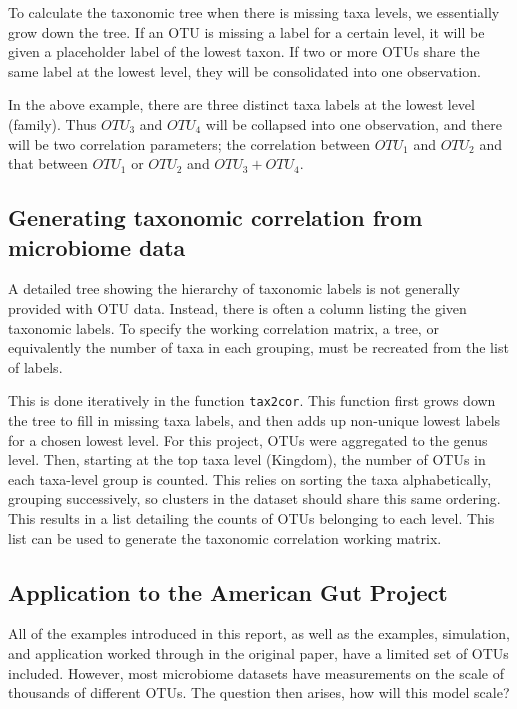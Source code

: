 \documentclass[12pt]{article}
\begin{document}
To calculate the taxonomic tree when there is missing taxa levels, we essentially grow down the tree. If an OTU is missing a label for a certain level, it will be given a placeholder label of the lowest taxon. If two or more OTUs share the same label at the lowest level, they will be consolidated into one observation.

In the above example, there are three distinct taxa labels at the lowest level (family). Thus $OTU_3$ and $OTU_4$ will be collapsed into one observation, and there will be two correlation parameters; the correlation between $OTU_1$ and $OTU_2$ and that between $OTU_1$ or $OTU_2$ and $OTU_3 + OTU_4$.

\subsection{Generating taxonomic correlation from microbiome data}

A detailed tree showing the hierarchy of taxonomic labels is not generally provided with OTU data. Instead, there is often a column listing the given taxonomic labels. To specify the working correlation matrix, a tree, or equivalently the number of taxa in each grouping, must be recreated from the list of labels.

This is done iteratively in the function \texttt{tax2cor}. This function first grows down the tree to fill in missing taxa labels, and then adds up non-unique lowest labels for a chosen lowest level. For this project, OTUs were aggregated to the genus level. Then, starting at the top taxa level (Kingdom), the number of OTUs in each taxa-level group is counted. This relies on sorting the taxa alphabetically, grouping successively, so clusters in the dataset should share this same ordering. This results in a list detailing the counts of OTUs belonging to each level. This list can be used to generate the taxonomic correlation working matrix.



\subsection{Application to the American Gut Project}

All of the examples introduced in this report, as well as the examples, simulation, and application worked through in the original paper, have a limited set of OTUs included. However, most microbiome datasets have measurements on the scale of thousands of different OTUs. The question then arises, how will this model scale?
\end{document}

